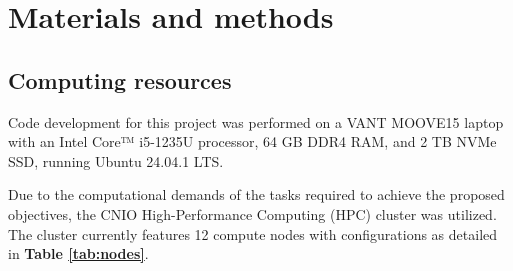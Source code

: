 \chapter{Materials and methods}

\section{Computing resources}

Code development for this project was performed on a VANT MOOVE15 laptop with an 
Intel\regsup{} Core™ i5-1235U processor, 64 GB DDR4 RAM, and 2 TB NVMe SSD, 
running Ubuntu 24.04.1 LTS.

Due to the computational demands of the tasks required to achieve the proposed
objectives, the CNIO High-Performance Computing (HPC) cluster was utilized. 
The cluster currently features 12 compute nodes with configurations as detailed 
in \textbf{Table \ref{tab:nodes}}.

\begingroup
\vspace{0.30cm}
\footnotesize

